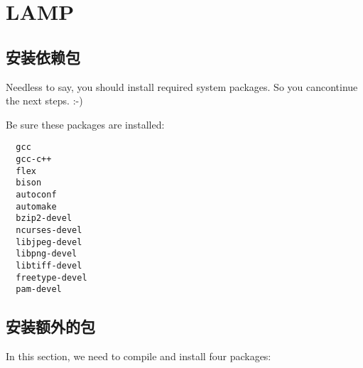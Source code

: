 \section{LAMP}

\subsection{安装依赖包}

Needless to say, you should install required system packages. So you
cancontinue the next steps. :-)

Be sure these packages are installed:

\small{
\begin{verbatim}
  gcc
  gcc-c++
  flex
  bison
  autoconf
  automake
  bzip2-devel
  ncurses-devel
  libjpeg-devel
  libpng-devel
  libtiff-devel
  freetype-devel
  pam-devel
\end{verbatim}
}
\normalsize

\subsection{安装额外的包}

In this section, we need to compile and install four packages:

